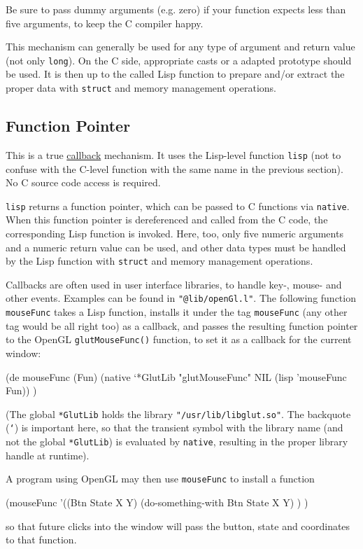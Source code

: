 Be sure to pass dummy arguments (e.g. zero) if your function expects
less than five arguments, to keep the C compiler happy.

This mechanism can generally be used for any type of argument and return
value (not only \texttt{long}). On the C side, appropriate casts or a
adapted prototype should be used. It is then up to the called Lisp
function to prepare and/or extract the proper data with \texttt{struct}
and memory management operations.

\subsection{Function Pointer}
\label{sec:native-function-pointer}

This is a true
\href{http://en.wikipedia.org/wiki/Callback\_(computer\_programming)}{callback}
mechanism. It uses the Lisp-level function \texttt{lisp} (not to
confuse with the C-level function with the same name in the previous
section). No C source code access is required.

\texttt{lisp} returns a function pointer, which can be passed to C
functions via \texttt{native}. When this function pointer is
dereferenced and called from the C code, the corresponding Lisp function
is invoked. Here, too, only five numeric arguments and a numeric return
value can be used, and other data types must be handled by the Lisp
function with \texttt{struct} and memory management operations.

Callbacks are often used in user interface libraries, to handle key-,
mouse- and other events. Examples can be found in
\texttt{"@lib/openGl.l"}. The following function \texttt{mouseFunc}
takes a Lisp function, installs it under the tag \texttt{mouseFunc} (any
other tag would be all right too) as a callback, and passes the
resulting function pointer to the OpenGL \texttt{glutMouseFunc()}
function, to set it as a callback for the current window:

\begin{wideverbatim}
(de mouseFunc (Fun)
   (native `*GlutLib "glutMouseFunc" NIL (lisp 'mouseFunc Fun)) )
\end{wideverbatim}

(The global \texttt{*GlutLib} holds the library
\texttt{"/usr/lib/libglut.so"}. The backquote (\texttt{`}) is important
here, so that the transient symbol with the library name (and not the
global \texttt{*GlutLib}) is evaluated by \texttt{native}, resulting in
the proper library handle at runtime).

A program using OpenGL may then use \texttt{mouseFunc} to install a
function

\begin{wideverbatim}
(mouseFunc
   '((Btn State X Y)
      (do-something-with Btn State X Y) ) )
\end{wideverbatim}

so that future clicks into the window will pass the button, state and
coordinates to that function.

